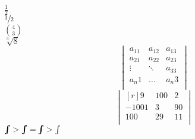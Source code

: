 \documentclass{article}
\begin{document}
	\noindent $\frac{1}{2}$\\
	$\sfrac{1}{2}$\\
	$\binom{4}{3}$\\
	$\sqrt[3]{8}$\\
\[
\begin{vmatrix}
 	a_11 & a_12 & a_13\\
 	a_21 & a_22 & a_23\\
 	\vdots & \ddots & a_33\\
 	a_n1 & \dots & a_n3\\
\end{vmatrix}
\]
\[
\begin{vmatrix*}[r]
	9 & 100 & 2\\
	-1001 & 3 & 90\\
	100 & 29 & 11\\
\end{vmatrix*}
\]
$\hm\int > \bm\int = \pmb\int > \int$
\end{document}
